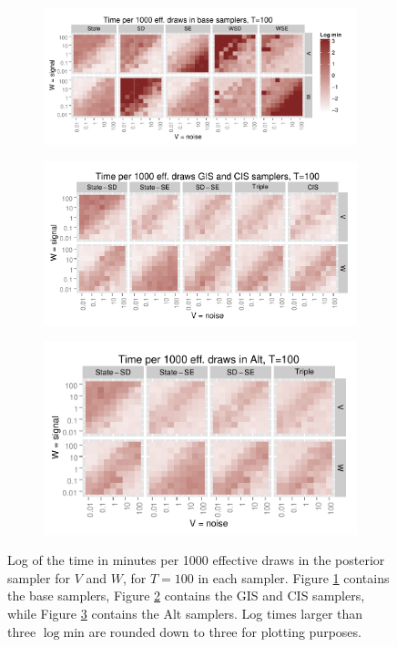 \documentclass[12pt]{article}
\begin{document}
\begin{figure}[!h]
\centering
\begin{subfigure}[b]{0.59\textwidth}
\includegraphics[width=\textwidth]{basecistimeplot100}
\caption{}
\label{fig:timea}
\end{subfigure}
\begin{subfigure}[b]{0.53\textwidth}
\includegraphics[width=\textwidth]{altgisVtimeplot100}
\caption{}
\label{fig:timeb}
\end{subfigure}
\begin{subfigure}[b]{0.45\textwidth}
\includegraphics[width=\textwidth]{altgisWtimeplot100}
\caption{}
\label{fig:timec}
\end{subfigure}
\caption{Log of the time in minutes per 1000 effective draws in the posterior sampler for $V$ and $W$, for $T=100$ in each sampler. Figure \ref{fig:timea} contains the base samplers, Figure \ref{fig:timeb} contains the GIS and CIS samplers, while Figure \ref{fig:timec} contains the Alt samplers. Log times larger than three $\log \mathrm{min}$ are rounded down to three for plotting purposes.}
\label{baseinttimeplot}
\end{figure}
\end{document}
